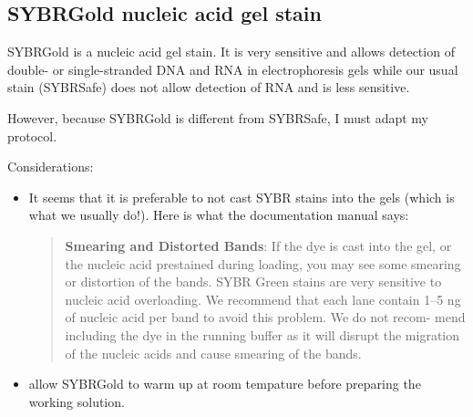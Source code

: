 \subsection{SYBR\cR Gold nucleic acid gel stain}
\label{task:20180315_cj1}

SYBR\cR Gold is a nucleic acid gel stain. It is very sensitive and allows detection of double- or single-stranded DNA and RNA in electrophoresis gels while our usual stain (SYBR\cR Safe) does not allow detection of RNA and is less sensitive.

However, because SYBR\cR Gold is different from SYBR\cR Safe, I must adapt my protocol. 

Considerations:
\begin{itemize}
\item It seems that it is preferable to not cast SYBR stains into the gels (which is what we usually do!). Here is what the documentation manual says:
\begin{quote}
\textbf{Smearing and Distorted Bands}: If the dye is cast into the gel, or the nucleic acid prestained during loading, you may see some smearing or distortion of the bands. SYBR Green stains are very sensitive to nucleic acid overloading. We recommend that each lane contain 1–5 ng of nucleic acid per band to avoid this problem. We do not recom- mend including the dye in the running buffer as it will disrupt the migration of the nucleic acids and cause smearing of the bands.
\end{quote}
\item allow SYBR\cR Gold to warm up at room tempature before preparing the working solution.
\end{itemize}

